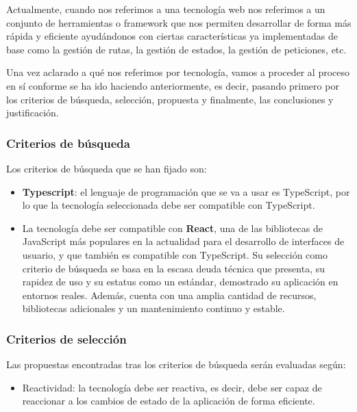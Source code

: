 Actualmente, cuando nos referimos a una tecnología web nos referimos a un conjunto de herramientas o framework que nos permiten desarrollar de forma más rápida y eficiente ayudándonos con ciertas características ya implementadas de base como la gestión de rutas, la gestión de estados, la gestión de peticiones, etc.

Una vez aclarado a qué nos referimos por tecnología, vamos a proceder al proceso en sí conforme se ha ido haciendo anteriormente, es decir, pasando primero por los criterios de búsqueda, selección, propuesta y finalmente, las conclusiones y justificación.

\subsubsection{Criterios de búsqueda}

Los criterios de búsqueda que se han fijado son:

\begin{itemize}
  \item \textbf{Typescript}: el lenguaje de programación que se va a usar es TypeScript, por lo que la tecnología seleccionada debe ser compatible con TypeScript.
  \item La tecnología debe ser compatible con \textbf{React}, una de las bibliotecas de JavaScript más populares en la actualidad para el desarrollo de interfaces de usuario, y que también es compatible con TypeScript. Su selección como criterio de búsqueda se basa en la escasa deuda técnica que presenta, su rapidez de uso y su estatus como un estándar, demostrado su aplicación en entornos reales. Además, cuenta con una amplia cantidad de recursos, bibliotecas adicionales y un mantenimiento continuo y estable.
\end{itemize}

\subsubsection{Criterios de selección}

Las propuestas encontradas tras los criterios de búsqueda serán evaluadas según:

\begin{itemize}
  \item Reactividad: la tecnología debe ser reactiva, es decir, debe ser capaz de reaccionar a los cambios de estado de la aplicación de forma eficiente.
\end{itemize}

